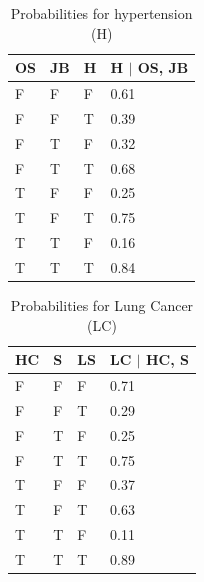 \begin{table}
\centering
\caption{Probabilities for hypertension (H)}\label{tab1}
\begin{tabular}{p{1.2cm} p{1.2cm} p{1.2cm} p{2cm} }
\hline
OS & JB & H & H $\mid$ OS, JB\\
\hline
F &	F &	F &	0.61\\
F &	F &	T &	0.39\\
F &	T &	F &	0.32\\
F &	T &	T &	0.68\\
T &	F &	F &	0.25\\
T &	F &	T &	0.75\\
T &	T &	F &	0.16\\
T &	T &	T &	0.84\\
\hline
\end{tabular}
\end{table}

\begin{table}
\centering
\caption{Probabilities for Lung Cancer (LC)}\label{tab1}
\begin{tabular}{p{1.2cm} p{1.2cm} p{1.2cm} p{2cm} }
\hline
 HC & S & LS & LC $\mid$ HC, S\\
\hline
F &	F &	F &	0.71\\
F &	F &	T &	0.29\\
F &	T &	F &	0.25\\
F &	T &	T &	0.75\\
T &	F &	F &	0.37\\
T &	F &	T &	0.63\\
T &	T &	F &	0.11\\
T &	T &	T &	0.89\\
\hline
\end{tabular}
\end{table}

